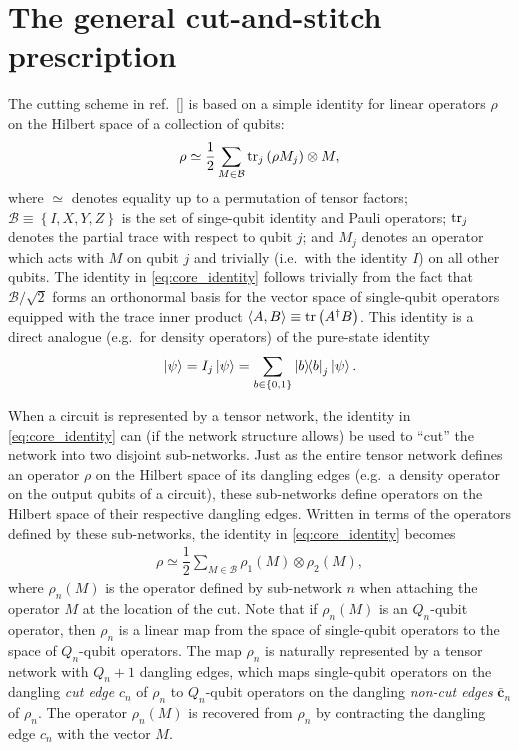 \documentclass[nofootinbib,notitlepage,11pt]{revtex4-2}
\newcommand{\f}[2]{\dfrac{#1}{#2}} %
\newcommand{\p}[1]{\left(#1\right)} %
\renewcommand{\set}[1]{\left\{#1\right\}} %
\newcommand{\bk}{\Braket} %
\renewcommand{\v}{\bm} %
\newcommand{\B}{\mathcal{B}}
\begin{document}
\section{The general cut-and-stitch prescription}
\label{sec:networks}

The cutting scheme in ref.~[] is based on
a simple identity for linear operators $\rho$ on the Hilbert space of
a collection of qubits:
\begin{align}
  \rho \simeq \f12 \sum_{M\in\B} \tr_j\p{\rho M_j}\otimes M,
  \label{eq:core_identity}
\end{align}
where $\simeq$ denotes equality up to a permutation of tensor factors;
$\B\equiv\set{I,X,Y,Z}$ is the set of singe-qubit identity and Pauli
operators; $\tr_j$ denotes the partial trace with respect to qubit
$j$; and $M_j$ denotes an operator which acts with $M$ on qubit $j$
and trivially (i.e.~with the identity $I$) on all other qubits.  The
identity in \eqref{eq:core_identity} follows trivially from the fact
that $\B/\sqrt2$ forms an orthonormal basis for the vector space of
single-qubit operators equipped with the trace inner product
$\bk{A,B}\equiv\tr\p{A^\dag B}$.  This identity is a direct analogue
(e.g.~for density operators) of the pure-state identity
\begin{align}
  \ket\psi = I_j\ket\psi=\sum_{b\in\set{0,1}} \op{b}_j \ket\psi.
\end{align}

When a circuit is represented by a tensor network, the identity in
\eqref{eq:core_identity} can (if the network structure allows) be used
to ``cut'' the network into two disjoint sub-networks.  Just as the
entire tensor network defines an operator $\rho$ on the Hilbert space
of its dangling edges (e.g.~a density operator on the output qubits of
a circuit), these sub-networks define operators on the Hilbert space
of their respective dangling edges.  Written in terms of the operators
defined by these sub-networks, the identity in
\eqref{eq:core_identity} becomes
\begin{align}
  \rho \simeq \f12 \sum_{M\in\B} \rho_1\p{M} \otimes \rho_2\p{M},
  \label{eq:cut_identity}
\end{align}
where $\rho_n\p{M}$ is the operator defined by sub-network $n$ when
attaching the operator $M$ at the location of the cut.  Note that if
$\rho_n\p{M}$ is an $Q_n$-qubit operator, then $\rho_n$ is a linear
map from the space of single-qubit operators to the space of
$Q_n$-qubit operators.  The map $\rho_n$ is naturally represented by a
tensor network with $Q_n+1$ dangling edges, which maps single-qubit
operators on the dangling {\it cut edge} $c_n$ of $\rho_n$ to
$Q_n$-qubit operators on the dangling {\it non-cut edges}
$\bar{\v c}_n$ of $\rho_n$.  The operator $\rho_n\p{M}$ is recovered
from $\rho_n$ by contracting the dangling edge $c_n$ with the vector
$M$.
\end{document}
